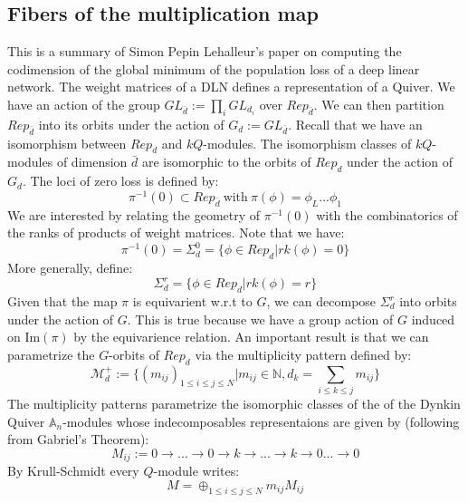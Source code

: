 \documentclass{article}
\theoremstyle{definition}
\begin{document}
\subsection*{Fibers of the multiplication map}
This is a summary of Simon Pepin Lehalleur's paper on computing the codimension of the global minimum of the population loss of a deep linear network.
The weight matrices of a DLN defines a representation of a Quiver. We have an action of the group $GL_{\bar{d}} := \prod_i GL_{d_i}$ over $Rep_{\bar{d}}$. We can then partition $Rep_{\bar{d}}$ into its orbits under the action of $G_d:=GL_{\bar{d}}$. Recall that we have an isomorphism between $Rep_d$ and $kQ$-modules. The isomorphism classes of $kQ$-modules of dimension $\bar{d}$ are isomorphic to the orbits of $Rep_d$ under the action of $G_d$. The loci of zero loss is defined by:
\begin{equation*}
    \pi^{-1}(0) \subset Rep_{\bar{d}} \ \text{with} \ \pi(\phi) = \phi_L...\phi_1
\end{equation*}
We are interested by relating the geometry of $\pi^{-1}(0)$ with the combinatorics of the ranks of products of weight matrices. Note that we have:
\begin{equation*}
    \pi^{-1}(0) = \Sigma_d^0 = \{\phi\in Rep_d| rk(\phi)=0\}
\end{equation*}
More generally, define:
\begin{equation*}
    \Sigma_d^r = \{\phi\in Rep_d| rk(\phi)=r\}
\end{equation*}
Given that the map $\pi$ is equivarient w.r.t to $G$, we can decompose $\Sigma_d^r$ into orbits under the action of $G$. This is true because we have a group action of $G$ induced on $\text{Im}(\pi)$ by the equivarience relation. An important result is that we can parametrize the $G$-orbits of $Rep_d$ via the multiplicity pattern defined by:
\begin{equation*}
    \mathcal{M}^+_d := \{(m_{ij})_{1\leq i \leq j \leq N}| m_{ij} \in \mathbb{N}, d_k = \sum_{i\leq k \leq j} m_{ij} \}
\end{equation*}
The multiplicity patterns parametrize the isomorphic classes of the of the Dynkin Quiver $\mathbb{A}_n$-modules whose indecomposables representaions are given by (following from Gabriel's Theorem):
\begin{equation*}
   M_{ij} := 0 \to .. .\to  0 \to  k \to  ... \to  k \to  0 ... \to  0
\end{equation*}
By Krull-Schmidt every $Q$-module writes:
\begin{equation*}
    M = \oplus_{1\leq i \leq j \leq N} m_{ij}M_{ij}
\end{equation*}
\end{document}
